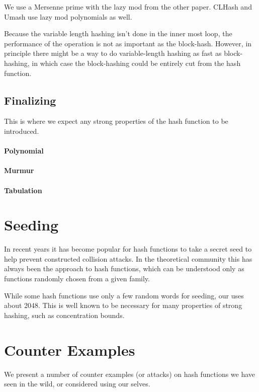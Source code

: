 We use a Mersenne prime
with the lazy mod from the other paper.
CLHash and Umash use lazy mod polynomials as well.

Because the variable length hashing isn't done in the inner most loop,
the performance of the operation is not as important as the block-hash.
However, in principle there might be a way to do variable-length hashing as fast as block-hashing, in which case the block-hashing could be entirely cut from the hash function.


\subsection{Finalizing}

This is where we expect any strong properties of the hash function to be introduced.

\paragraph{Polynomial}
\paragraph{Murmur}
\paragraph{Tabulation}



\section{Seeding}

In recent years it has become popular for hash functions to take a secret seed
to help prevent constructed collision attacks.
In the theoretical community this has always been the approach to hash functions,
which can be understood only as functions randomly chosen from a given family.

While some hash functions use only a few random words for seeding, our uses about 2048.
This is well known to be necessary for many properties of strong hashing, such as concentration bounds.

   

\section{Counter Examples}

We present a number of counter examples (or attacks) on hash functions we have seen in the wild, or considered using our selves.

